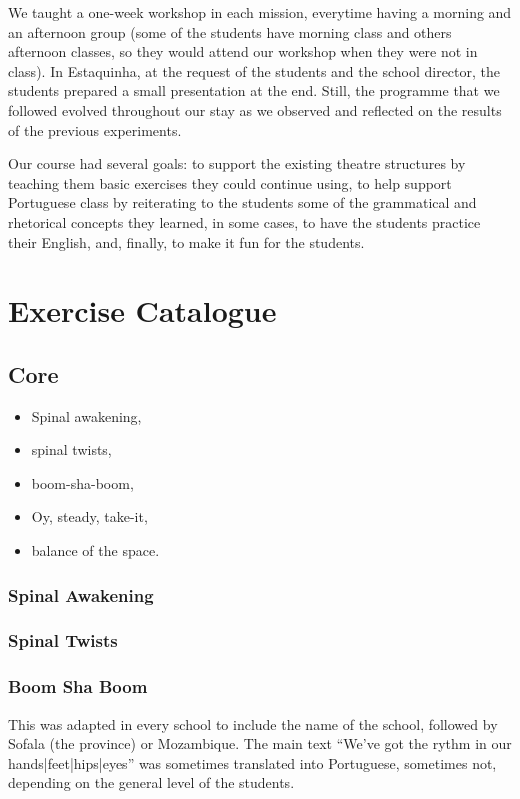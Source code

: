 \documentclass[article,twocolumn,twoside]{memoir}
\begin{document}
We taught a one-week workshop in each mission, everytime having a morning and
an afternoon group (some of the students have morning class and others
afternoon classes, so they would attend our workshop when they were not in
class). In Estaquinha, at the request of the students and the school director,
the students prepared a small presentation at the end. Still, the programme
that we followed evolved throughout our stay as we observed and reflected on
the results of the previous experiments.

Our course had several goals: to support the existing theatre structures by
teaching them basic exercises they could continue using, to help support
Portuguese class by reiterating to the students some of the grammatical and
rhetorical concepts they learned, in some cases, to have the students practice
their English, and, finally, to make it fun for the students.

\chapter{Exercise Catalogue}
\section{Core}
\begin{itemize}
\item Spinal awakening,
\item spinal twists,
\item boom-sha-boom,
\item Oy, steady, take-it,
\item balance of the space.
\end{itemize}

\subsection{Spinal Awakening}
\subsection{Spinal Twists}
\subsection{Boom Sha Boom}
This was adapted in every school to include the name of the school, followed by
Sofala (the province) or Mozambique. The main text ``We've got the rythm in our
hands|feet|hips|eyes'' was sometimes translated into Portuguese, sometimes not,
depending on the general level of the students.
\end{document}
